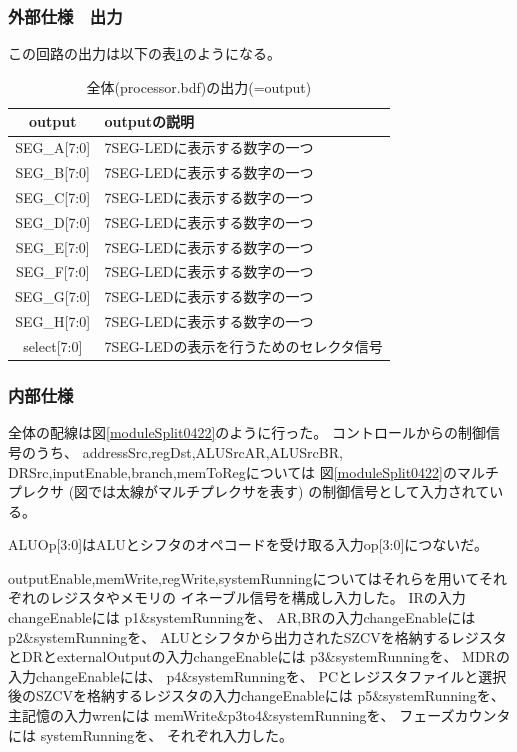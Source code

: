 \documentclass[a4j,titlepage]{jarticle}
\begin{document}
\subsubsection{外部仕様　出力}
この回路の出力は以下の表\ref{zentaiprocessorO}のようになる。
\begin{table}[H]
    \caption{全体(processor.bdf)の出力(=output)}
    \label{zentaiprocessorO}
    \begin{center}
    \begin {tabularx}{150mm}{|c|X|} \hline
         output & outputの説明 \\ \hline \hline
         SEG\_A[7:0] & 7SEG-LEDに表示する数字の一つ\\ \hline
         SEG\_B[7:0] & 7SEG-LEDに表示する数字の一つ\\ \hline %
         SEG\_C[7:0] & 7SEG-LEDに表示する数字の一つ\\ \hline
         SEG\_D[7:0] & 7SEG-LEDに表示する数字の一つ\\ \hline
         SEG\_E[7:0] & 7SEG-LEDに表示する数字の一つ\\ \hline
         SEG\_F[7:0] & 7SEG-LEDに表示する数字の一つ\\ \hline
         SEG\_G[7:0] & 7SEG-LEDに表示する数字の一つ\\ \hline
         SEG\_H[7:0] & 7SEG-LEDに表示する数字の一つ\\ \hline
         select[7:0] & 7SEG-LEDの表示を行うためのセレクタ信号\\ \hline
    \end {tabularx}
    \end{center}
\end{table}

\subsubsection{内部仕様}
全体の配線は図\ref{moduleSplit0422}のように行った。
コントロールからの制御信号のうち、
addressSrc,regDst,ALUSrcAR,ALUSrcBR,
DRSrc,inputEnable,branch,memToRegについては
図\ref{moduleSplit0422}のマルチプレクサ
(図では太線がマルチプレクサを表す)
の制御信号として入力されている。

ALUOp[3:0]はALUとシフタのオペコードを受け取る入力op[3:0]につないだ。

outputEnable,memWrite,regWrite,systemRunningについてはそれらを用いてそれぞれのレジスタやメモリの
イネーブル信号を構成し入力した。
IRの入力changeEnableには
p1\&systemRunningを、
AR,BRの入力changeEnableには
p2\&systemRunningを、
ALUとシフタから出力されたSZCVを格納するレジスタとDRとexternalOutputの入力changeEnableには
p3\&systemRunningを、
MDRの入力changeEnableには、
p4\&systemRunningを、
PCとレジスタファイルと選択後のSZCVを格納するレジスタの入力changeEnableには
p5\&systemRunningを、
主記憶の入力wrenには
memWrite\&p3to4\&systemRunningを、
フェーズカウンタには
systemRunningを、
それぞれ入力した。
\end{document}
